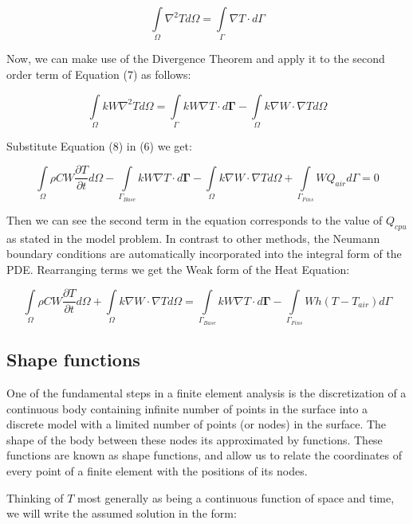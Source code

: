 \documentclass[12pt]{article}
\begin{document}
	$$
	\int\limits_{\Omega} \nabla^2 T d\Omega = \int\limits_{\Gamma} \nabla T \cdot d\Gamma 
	$$
	
Now, we can make use of the Divergence Theorem and apply it to the second order term of Equation (7) as follows:	
	
	\begin{equation}
	\int\limits_{\Omega} k W \nabla^2 T d\Omega = \int\limits_{\Gamma} {kW\nabla T} \cdot d \mathbf{\Gamma} - \int\limits_{\Omega} k \nabla W \cdot \nabla T d\Omega
	\end{equation}

	Substitute Equation (8) in (6) we get:
	
	\begin{equation}
	\int\limits_{\Omega} \rho C W \frac{\partial T}{\partial t} d\Omega -  \int\limits_{\Gamma_{Base}} {kW\nabla T} \cdot d \mathbf{\Gamma} - \int\limits_{\Omega} k \nabla  W \cdot \nabla T d\Omega + \int\limits_{\Gamma_{Fins}} W Q_{air} d\Gamma = 0
	\end{equation}
		
	Then we can see the second term in the equation corresponds to the value of $Q_{cpu}$ as stated in the model problem. In contrast to other methods, the Neumann boundary conditions are automatically incorporated into the integral form of the PDE. Rearranging terms we get the Weak form of the Heat Equation:

	\begin{equation}
	\int\limits_{\Omega} \rho C W \frac{\partial T}{\partial t} d\Omega + \int\limits_{\Omega} k \nabla W \cdot \nabla T d\Omega = \int\limits_{\Gamma_{Base}} {kW\nabla T} \cdot d \mathbf{\Gamma} - \int\limits_{\Gamma_{Fins}} W {h(T-T_{air})} d\Gamma
	\end{equation}

	\subsection{Shape functions}

One of the fundamental steps in a finite element analysis is the discretization of a continuous body containing infinite number of points in the surface into a discrete model with a limited number of points (or nodes) in the surface. The shape of the body between these nodes its approximated by functions. These functions are known as shape functions, and allow us to relate the coordinates of every point of a finite element with the positions of its nodes.

Thinking of $T$ most generally as being a continuous function of space and time, we will write the assumed solution in the form:
\end{document}
